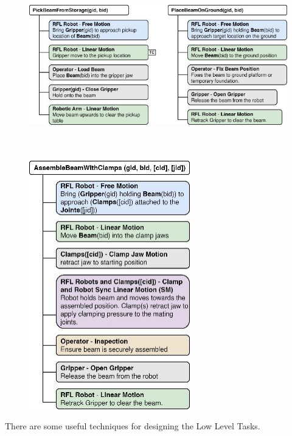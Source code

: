 \documentclass[11pt]{book}
\begin{document}
\begin{itemize}
\begin{figure}[H]
\includegraphics[width=15.92cm,height=7.37cm]{./images/image22.jpeg}
\end{figure}


\end{itemize}
\vspace{1\baselineskip}
\begin{figure}[H]
\includegraphics[width=7.0cm,height=10.78cm]{./images/image23.jpeg}
\end{figure}


\vspace{1\baselineskip}
There are some useful techniques for designing the Low Level Tasks. 
\end{document}

